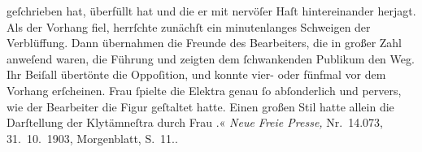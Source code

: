 {{{                        geſchrieben hat, überfüllt hat und die er mit nervöſer Haſt hintereinander
                        herjagt. Als der Vorhang fiel, herrſchte zunächſt ein minutenlanges
                        Schweigen der Verblüffung. Dann übernahmen die Freunde des Bearbeiters, die
                        in großer Zahl anweſend waren, die Führung und zeigten dem{ }ſchwankenden
                        Publikum den Weg. Ihr Beiſall übertönte die Oppoſition, und
                            konnte vier- oder fünfmal vor dem Vorhang
                           erſcheinen. Frau ſpielte die Elektra genau{ }ſo
                        abſonderlich und pervers, wie der Bearbeiter die Figur geſtaltet hatte.
                        Einen großen Stil hatte allein die Darſtellung der Klytämneſtra durch Frau
                           .« \emph{Neue
                           Freie Presse,} Nr. 14.073, 31. 10. 1903,
                        Morgenblatt, S. 11.}}}\label{K_L01334-1}.\pend
           \endnumbering{}  \newcommand{\dateiname}{L01334}\newcommand{\titel}{Hugo von Hofmannsthal an Arthur Schnitzler, 3. 11. [1903]}\newcommand{\editorInnen}{Martin Anton Müller und Gerd-Hermann Susen}
